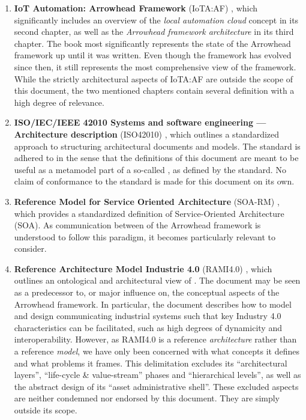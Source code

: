 \begin{enumerate}

\item \textbf{IoT Automation: Arrowhead Framework} (IoTA:AF) \cite{delsing2017iot}, which significantly includes an overview of the \textit{local automation cloud} concept in its second chapter, as well as the \textit{Arrowhead framework architecture} in its third chapter.
The book most significantly represents the state of the Arrowhead framework up until it was written.
Even though the framework has evolved since then, it still represents the most comprehensive view of the framework.
While the strictly architectural aspects of IoTA:AF are outside the scope of this document, the two mentioned chapters contain several definition with a high degree of relevance.

\item \textbf{ISO/IEC/IEEE 42010 Systems and software engineering — Architecture description} (ISO42010) \cite{iso42010}, which outlines a standardized approach to structuring architectural documents and models.
The standard is adhered to in the sense that the definitions of this document are meant to be useful as a metamodel part of a so-called , as defined by the standard.
No claim of conformance to the standard is made for this document on its own.

\item \textbf{Reference Model for Service Oriented Architecture} (SOA-RM) \cite{mackenzie2006reference}, which provides a standardized definition of Service-Oriented Architecture (SOA).
As communication between  of the Arrowhead framework is understood to follow this paradigm, it becomes particularly relevant to consider.

\item \textbf{Reference Architecture Model Industrie 4.0} (RAMI4.0) \cite{adolphs2016reference}, which outlines an ontological and architectural view of .
The document may be seen as a predecessor to, or major influence on, the conceptual aspects of the Arrowhead framework.
In particular, the document describes how to model and design communicating industrial systems such that key Industry 4.0 characteristics can be facilitated, such as high degrees of dynamicity and interoperability.
However, as RAMI4.0 is a reference \textit{architecture} rather than a reference \textit{model}, we have only been concerned with what concepts it defines and what problems it frames.
This delimitation excludes its ``architectural layers'', ``life-cycle \& value-stream'' phases and ``hierarchical levels'', as well as the abstract design of its ``asset administrative shell''.
These excluded aspects are neither condemned nor endorsed by this document.
They are simply outside its scope.

\end{enumerate}

